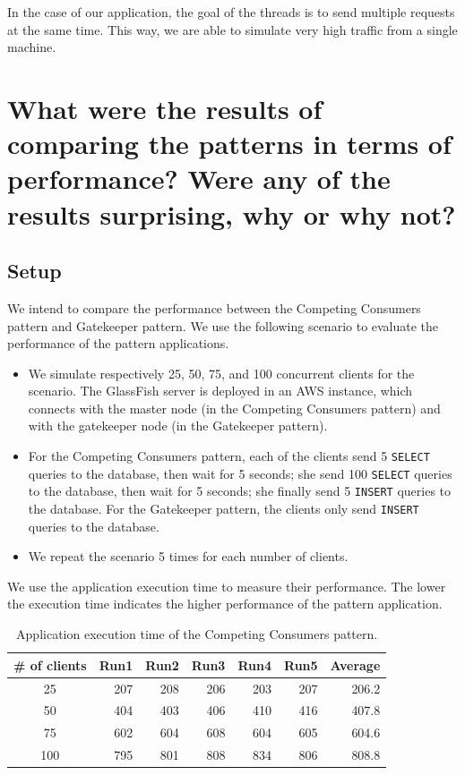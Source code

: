 \documentclass{article}
\begin{document}
In the case of our application, the goal of the threads is to send multiple requests at the same time. This way, we are able to simulate very high traffic from a single machine. 


\section{What were the results of comparing the patterns in terms of performance? Were any of the results surprising, why or why not?}\label{Q5}

\subsection{Setup}
We intend to compare the performance between the Competing Consumers pattern and Gatekeeper pattern. We use the following scenario to evaluate the performance of the pattern applications. 

\begin{itemize}
\item We simulate respectively 25, 50, 75, and 100 concurrent clients for the scenario. The GlassFish server is deployed in an AWS instance, which connects with the master node (in the Competing Consumers pattern) and with the gatekeeper node (in the Gatekeeper pattern).
\item For the Competing Consumers pattern, each of the clients send 5 \texttt{SELECT} queries to the database, then wait for 5 seconds; she send 100 \texttt{SELECT} queries to the database, then wait for 5 seconds; she finally send 5 \texttt{INSERT} queries to the database. For the Gatekeeper pattern, the clients only send \texttt{INSERT} queries to the database.
\item We repeat the scenario 5 times for each number of clients.
\end{itemize}

We use the application execution time to measure their performance. The lower the execution time indicates the higher performance of the pattern application.


\begin{table}[t]
    \centering
    \caption{Application execution time of the Competing Consumers pattern.}
    \label{tab:ccp_performance}
    \begin{tabular}{|c|r|r|r|r|r|r|}
        \hline
        \textbf{\# of clients} & \textbf{Run1} & \textbf{Run2} & \textbf{Run3} & \textbf{Run4} & \textbf{Run5} & \textbf{Average}\\ \hline
        25 & 207 & 208 & 206 & 203 & 207 & 206.2 \\ \hline 
        50 & 404 & 403 & 406 & 410 & 416 & 407.8 \\ \hline
        75 & 602 & 604 & 608 & 604 & 605 & 604.6 \\ \hline
        100 & 795 & 801 & 808 & 834 & 806 & 808.8 \\ \hline
	\end{tabular}
\end{table}
\end{document}
